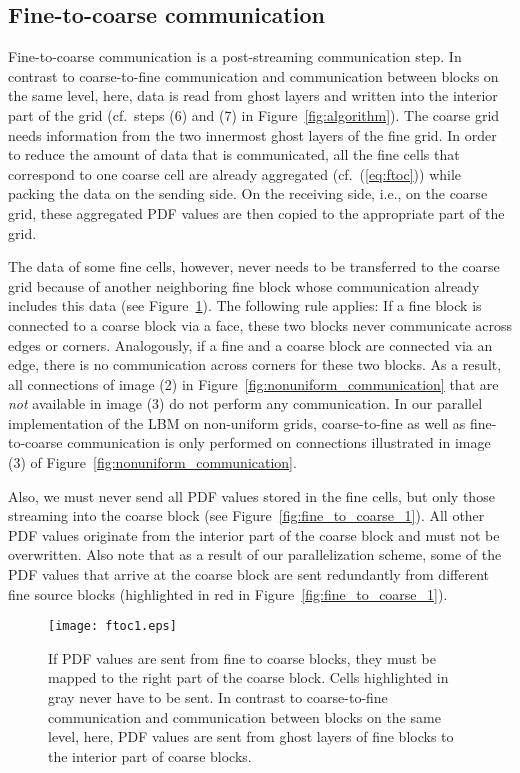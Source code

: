\documentclass[final,leqno,onefignum,onetabnum]{siamltex1213}
\begin{document}
\subsection{Fine-to-coarse communication}\label{sec:lbmref:ftc}

Fine-to-coarse communication is a post-streaming communication step.
In contrast to coarse-to-fine communication and communication between blocks on the same level,
here, data is read from ghost layers and written into the interior part of the grid (cf.\ steps (6) and (7) in Figure~\ref{fig:algorithm}).
The coarse grid needs information from the two innermost ghost layers of the fine grid.
In order to reduce the amount of data that is communicated,
all the fine cells that correspond to one coarse cell are already aggregated (cf.~(\ref{eq:ftoc})) while packing the data on the sending side.
On the receiving side, i.e., on the coarse grid, these aggregated PDF values are then copied to the appropriate part of the grid.

The data of some fine cells, however, never needs to be transferred to the coarse grid because of another neighboring fine block whose communication already includes this data (see Figure~\ref{fig:fine_to_coarse_2}).
The following rule applies: If a fine block is connected to a coarse block via a face, these two blocks never communicate across edges or corners.
Analogously, if a fine and a coarse block are connected via an edge, there is no communication across corners for these two blocks.
As a result, all connections of image (2) in Figure~\ref{fig:nonuniform_communication} that are \emph{not} available in image (3) do not perform any communication.
In our parallel implementation of the LBM on non-uniform grids, coarse-to-fine as well as fine-to-coarse communication is only performed on connections illustrated in image (3) of Figure~\ref{fig:nonuniform_communication}.

Also, we must never send all PDF values stored in the fine cells, but only those streaming into the coarse block (see Figure~\ref{fig:fine_to_coarse_1}).
All other PDF values originate from the interior part of the coarse block and must not be overwritten.
Also note that as a result of our parallelization scheme,
some of the PDF values that arrive at the coarse block are sent redundantly from different fine source blocks (highlighted in red in Figure~\ref{fig:fine_to_coarse_1}).

\begin{figure}[tbp]
  \centering
  \texttt{[image: ftoc1.eps]}
  \caption{If PDF values are sent from fine to coarse blocks, they must be mapped to the right part of the coarse block.
Cells highlighted in gray never have to be sent.
In contrast to coarse-to-fine communication and communication between blocks on the same level,
here, PDF values are sent from ghost layers of fine blocks to the interior part of coarse blocks.}
  \label{fig:fine_to_coarse_2}
\end{figure}
\end{document}
